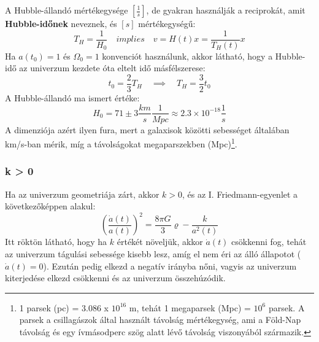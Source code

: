\documentclass[../main.tex]{subfiles}
\begin{document}
A Hubble-állandó mértékegysége $[\frac{1}{s}]$, de gyakran használják a reciprokát, amit \textbf{Hubble-időnek} neveznek, és $[s]$ mértékegységű:
\begin{equation}
    T_H = \frac{1}{H_0} \quad implies \quad v = H(t) x = \frac{1}{T_H(t)} x
\end{equation}
Ha $a(t_0) = 1$ és $\Omega_0 = 1$ konvenciót használunk, akkor látható, hogy a Hubble-idő az univerzum kezdete óta eltelt idő másfélszerese:
\begin{equation}
    t_0 = \frac{2}{3} T_H \quad \implies \quad T_H = \frac{3}{2} t_0
\end{equation}
A Hubble-állandó ma ismert értéke:
\begin{equation}
    H_0 = 71 \pm 3 \frac{km}{s}\frac{1}{Mpc} \approx 2.3 \times 10^{-18} \frac{1}{s}
\end{equation}
A dimenziója azért ilyen fura, mert a galaxisok közötti sebességet általában km/s-ban mérik, míg a távolságokat megaparszekben (Mpc)\footnote{
    1 parsek (pc) = 3.086 x $10^{16}$ m, tehát 1 megaparsek (Mpc) = $10^6$ parsek. A parsek a csillagászok által használt távolság mértékegység, ami a Föld-Nap távolság és egy ívmásodperc szög alatt
    lévő távolság viszonyából származik.
}.

\subsubsection*{k > 0}
Ha az univerzum geometriája zárt, akkor $k > 0$, és az I. Friedmann-egyenlet a következőképpen alakul:
\begin{equation}
    \left(\frac{\dot{a}(t)}{a(t)}\right)^2 = \frac{8 \pi G}{3} \varrho - \frac{k}{a^2(t)}
\end{equation}
Itt röktön látható, hogy ha $k$ értékét növeljük, akkor $\dot{a}(t)$ csökkenni fog, tehát az univerzum tágulási sebessége kisebb lesz, amíg el nem éri az álló állapotot ($\dot{a}(t) = 0$). Ezután pedig elkezd a negatív irányba
nőni, vagyis az univerzum kiterjedése elkezd csökkenni és az univerzum összehúzódik.
\end{document}
